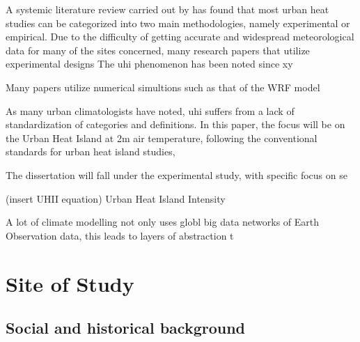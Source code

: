 A systemic literature review carried out by \textcite{kim_2021} has found that most urban heat studies can be categorized into two main methodologies, namely experimental or empirical. Due to the difficulty of getting accurate and widespread meteorological data for many of the sites concerned, many research papers that utilize experimental designs
The \Gls{uhi} phenomenon has been noted since xy 

Many papers utilize numerical simultions such as that of the WRF model

As many urban climatologists have noted, \Gls{uhi} suffers from a lack of standardization of categories and definitions. In this paper, the focus will be on the Urban Heat Island at 2m air temperature, following the conventional standards for urban heat island studies,



The dissertation will fall under the experimental study, with specific focus on se

(insert UHII equation)
Urban Heat Island Intensity 









A lot of climate modelling not only uses globl big data networks of Earth Observation data, this leads to layers of abstraction t




\newpage
\section{Site of Study}
    
\subsection{Social and historical background}

